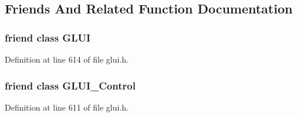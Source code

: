\subsection{Friends And Related Function Documentation}
\hypertarget{class_g_l_u_i___main_a8b2353bef6e8c665a923971433c0c999}{
\subsubsection[{G\+L\+U\+I}]{\setlength{\rightskip}{0pt plus 5cm}friend class {\bf G\+L\+U\+I}\hspace{0.3cm}{\ttfamily [friend]}}}\label{class_g_l_u_i___main_a8b2353bef6e8c665a923971433c0c999}


Definition at line 614 of file glui.\+h.

\hypertarget{class_g_l_u_i___main_a1ac6a21915ff78bdda7d92427b2b9337}{
\subsubsection[{G\+L\+U\+I\+\_\+\+Control}]{\setlength{\rightskip}{0pt plus 5cm}friend class {\bf G\+L\+U\+I\+\_\+\+Control}\hspace{0.3cm}{\ttfamily [friend]}}}\label{class_g_l_u_i___main_a1ac6a21915ff78bdda7d92427b2b9337}


Definition at line 611 of file glui.\+h.

